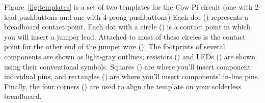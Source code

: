 Figure~\ref{fig:templates} is a set of two %
templates for the Cow Pi circuit %
(one with 2-lead pushbuttons and one with 4-prong pushbuttons)
Each dot () represents a breadboard contact point.
Each dot with a circle () is a contact point in which you will insert a jumper lead.
Attached to most of these circles is the contact point for the other end of the jumper wire ().
The footprints of several components are shown as light-gray outlines;
resistors () and LEDs () are shown using their conventional symbols.
Squares () are where you'll insert component individual pins,
and rectangles () are where you'll insert components' in-line pins.
Finally, the four corners () are used to align the template on your solderless breadboard.

